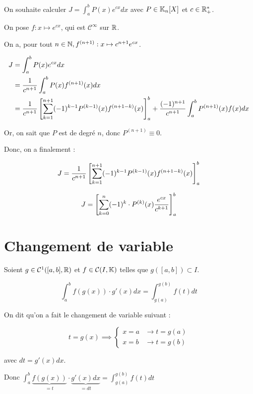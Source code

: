 \documentclass[12pt, a4paper]{report}
\begin{document}
\begin{application}
    On souhaite calculer $J=\int_a^b P(x)e^{cx}dx$ avec $P\in\mathbb{K}_n[X]$ et $c\in\mathbb{R}_+^*$.

    On pose $f:x\mapsto e^{cx}$, qui est $\mathcal{C}^\infty$ sur $\mathbb{R}$.

    On a, pour tout $n \in \mathbb{N}, f^{(n+1)}:x\mapsto c^{n+1} e^{cx}$.

    \begin{align*}
        J&=\int_a^b P(x)e^{cx}dx\\
        &=\frac{1}{c^{n+1}}\int_a^b P(x) f^{(n+1)}(x) dx\\
        &=\frac{1}{c^{n+1}}\left[\sum_{k=1}^{n+1} (-1)^{k-1} P^{(k-1)}(x) f^{(n+1-k)}(x)\right]_a^b + \frac{(-1)^{n+1}}{c^{n+1}}\int_a^b P^{(n+1)}(x) f(x) dx
    \end{align*}

    Or, on sait que $P$ est de degré $n$, donc $P^{(n+1)}\equiv 0$.

    Donc, on a finalement :

    $$J=\frac{1}{c^{n+1}}\left[\sum_{k=1}^{n+1} (-1)^{k-1} P^{(k-1)}(x) f^{(n+1-k)}(x)\right]_a^b$$

    $$J=\left[\sum_{k=0}^n(-1)^k \cdot P^{(k)}(x)\frac{e^{cx}}{c^{k+1}}\right]_a^b$$
\end{application}

\section{Changement de variable}

\begin{definition}
   Soient $g\in\mathcal{C}^1([a,b],\mathbb{R})$ et $f\in\mathcal{C}(I,\mathbb{K})$ telles que $g([a,b])\subset I$.

    $$\int_a^b f(g(x))\cdot g'(x) dx = \int_{g(a)}^{g(b)} f(t) dt$$

    On dit qu'on a fait le changement de variable suivant :
    
    $$t=g(x)\implies \begin{cases}x=a&\rightarrow t=g(a)\\x=b&\rightarrow t=g(b)\end{cases}$$
    
    avec $dt=g'(x)dx$.

    Donc $\int_a^b \underbrace{f(g(x))}_{=t}\cdot \underbrace{g'(x)dx}_{=dt}=\int_{g(a)}^{g(b)}f(t)dt$
\end{definition}
\end{document}
